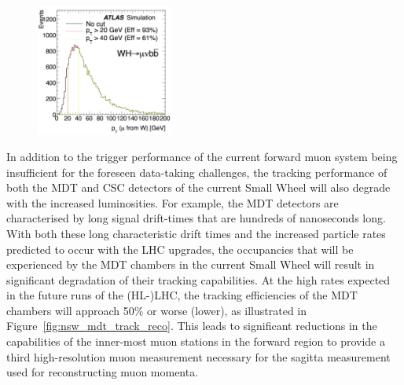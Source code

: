 \begin{figure}[!htb]
    \begin{center}
        \includegraphics[width=0.4\textwidth]{figures/nsw/nsw_ptmu_wh}
        \caption{
        }
        \label{fig:nsw_wh_loss}
    \end{center}
\end{figure}

In addition to the trigger performance of the current forward muon system being insufficient
for the foreseen data-taking challenges, the tracking performance of both the MDT and CSC detectors of the current Small Wheel
will also degrade with the increased luminosities.
For example, the MDT detectors are characterised by long signal drift-times that are hundreds of nanoseconds long.
With both these long characteristic drift times and the increased particle rates predicted to occur with the LHC upgrades,
the occupancies that will be experienced by the MDT chambers in the current Small Wheel
will result in significant degradation of their tracking capabilities.
At the high rates expected in the future runs of the (HL-)LHC, the tracking efficiencies
of the MDT chambers will approach 50\% or worse (lower), as illustrated in Figure~\ref{fig:nsw_mdt_track_reco}.
This leads to significant reductions in the capabilities of the inner-most muon stations
in the forward region to provide a third high-resolution muon measurement necessary for the sagitta measurement used for reconstructing
muon momenta.

